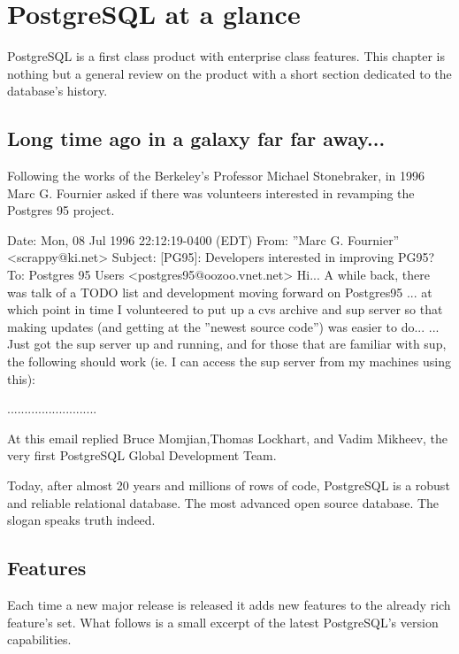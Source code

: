 \chapter{PostgreSQL at a glance}
PostgreSQL is a first class product with enterprise class features.
This chapter is nothing but a general review on the product with a short section dedicated to the 
database's history.

\section{Long time ago in a galaxy far far away...}

Following the works of the Berkeley's Professor  Michael Stonebraker, in 1996
Marc G. Fournier asked if there was volunteers interested
in revamping the Postgres 95 project.\newline
\begin{smallverbatim}

Date: Mon, 08 Jul 1996 22:12:19-0400 (EDT) 
From: ”Marc G. Fournier” <scrappy@ki.net>
Subject: [PG95]: Developers interested in improving PG95?
To: Postgres 95 Users <postgres95@oozoo.vnet.net>
Hi... A while back, there was talk of a TODO list and development moving forward on Postgres95 ...
at which point in time I volunteered to put up a cvs archive and sup server so that making updates 
(and getting at the ”newest source code”) was easier to do...
... Just got the sup server up and running, and for those that are familiar with sup, the following 
should work (ie. I can access the sup server from my machines using this): 

..........................
\end{smallverbatim}


At this email replied  Bruce Momjian,Thomas Lockhart, 
and Vadim Mikheev, the very first PostgreSQL Global Development Team.\newline 

Today, after almost 20 years and millions of rows of code, PostgreSQL is a robust and reliable 
relational database. The most advanced open source database. The slogan speaks truth indeed.

\section{Features}
Each time a new major release is released it adds new features to the already 
rich feature's set. What follows is a small excerpt of the latest PostgreSQL's version 
capabilities. 

